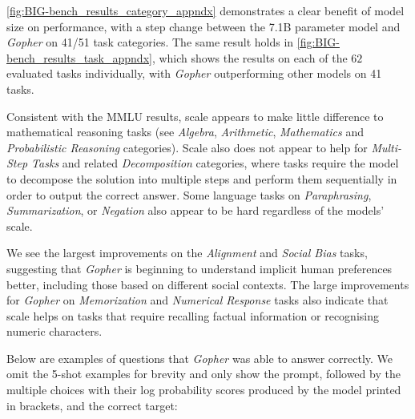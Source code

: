 \documentclass[11pt, a4paper, logo, internal, copyright, nonumbering]{deepmind}
\newcommand{\gopher}{\textit{Gopher}\xspace}
\begin{document}
\autoref{fig:BIG-bench_results_category_appndx} demonstrates a clear benefit of model size on performance, with a step change between the 7.1B parameter model and \gopher on 41/51 task categories. 
The same result holds in \autoref{fig:BIG-bench_results_task_appndx}, which shows the results on each of the $62$ evaluated tasks individually, with \gopher outperforming other models on 41 tasks.  

Consistent with the MMLU results, scale appears to make little difference to mathematical reasoning tasks (see \textit{Algebra}, \textit{Arithmetic}, \textit{Mathematics} and \textit{Probabilistic Reasoning} categories). Scale also does not appear to help for \textit{Multi-Step Tasks} and related \textit{Decomposition} categories, where tasks require the model to decompose the solution into multiple steps and perform them sequentially in order to output the correct answer. 
Some language tasks on \textit{Paraphrasing}, \textit{Summarization}, or \textit{Negation} also appear to be hard regardless of the models' scale. 


We see the largest improvements on the \textit{Alignment} and \textit{Social Bias} tasks, suggesting that \gopher is beginning to understand implicit human preferences better, including those based on different social contexts. The large improvements for \gopher on \textit{Memorization} and \textit{Numerical Response} tasks also indicate that scale helps on tasks that require recalling factual information or recognising numeric characters. 

Below are examples of questions that \gopher was able to answer correctly. We omit the 5-shot examples for brevity and only show the prompt, followed by the multiple choices with their log probability scores produced by the model printed in brackets, and the correct target:
\end{document}
